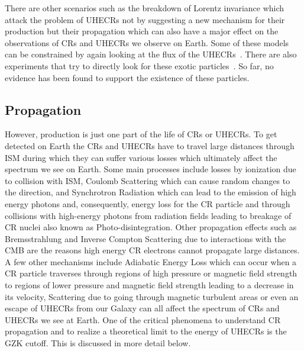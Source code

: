 There are other scenarios such as the breakdown of Lorentz invariance which attack the problem of \glspl{UHECR} not by suggesting a new mechanism for their production but their propagation which can also have a major effect on the observations of \glspl{CR} and \glspl{UHECR} we observe on Earth. Some of these models can be constrained by again looking at the flux of the \glspl{UHECR}~\cite{PierreAuger:2021tog}. There are also experiments that try to directly look for these exotic particles~\cite{XENON:2023cxc,LZ:2022lsv}. So far, no evidence has been found to support the existence of these particles. 

\subsection{Propagation}
\label{subsec:crprop}
However, production is just one part of the life of \glspl{CR} or \glspl{UHECR}. To get detected on Earth the \glspl{CR} and \glspl{UHECR} have to travel large distances through ISM during which they can suffer various losses which ultimately affect the spectrum we see on Earth. Some main processes include losses by ionization due to collision with ISM, Coulomb Scattering which can cause random changes to the direction, and Synchrotron Radiation which can lead to the emission of high energy photons and, consequently, energy loss for the \gls{CR} particle and through collisions with high-energy photons from radiation fields leading to breakage of CR nuclei also known as Photo-disintegration. Other propagation effects such as Bremsstrahlung and Inverse Compton Scattering due to interactions with the \gls{CMB} are the reasons high energy \gls{CR} electrons cannot propagate large distances. A few other mechanisms include Adiabatic Energy Loss which can occur when a CR particle traverses through regions of high pressure or magnetic field strength to regions of lower pressure and magnetic field strength leading to a decrease in its velocity, Scattering due to going through magnetic turbulent areas or even an escape of \glspl{UHECR} from our Galaxy can all affect the spectrum of \glspl{CR} and \glspl{UHECR} we see at Earth. One of the critical phenomena to understand \gls{CR} propagation and to realize a theoretical limit to the energy of \glspl{UHECR} is the \gls{GZK} cutoff. This is discussed in more detail below.


